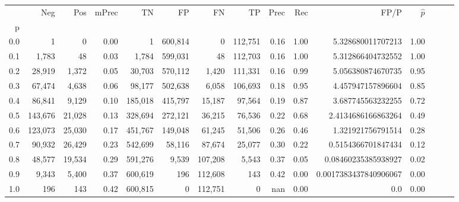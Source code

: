 \begin{tabular}{rrrrrrrrrrrrrrr}
\toprule
{} &      Neg &     Pos & mPrec &       TN &       FP &       FN &       TP &  Prec &   Rec &                   FP/P & $\hat{p}$ \\
p   &          &         &       &          &          &          &          &       &       &                        &           \\
\midrule
0.0 &        1 &       0 &  0.00 &        1 &  600,814 &        0 &  112,751 &  0.16 &  1.00 &      5.328680011707213 &      1.00 \\
0.1 &    1,783 &      48 &  0.03 &    1,784 &  599,031 &       48 &  112,703 &  0.16 &  1.00 &      5.312866404732552 &      1.00 \\
0.2 &   28,919 &   1,372 &  0.05 &   30,703 &  570,112 &    1,420 &  111,331 &  0.16 &  0.99 &      5.056380874670735 &      0.95 \\
0.3 &   67,474 &   4,638 &  0.06 &   98,177 &  502,638 &    6,058 &  106,693 &  0.18 &  0.95 &      4.457947157896604 &      0.85 \\
0.4 &   86,841 &   9,129 &  0.10 &  185,018 &  415,797 &   15,187 &   97,564 &  0.19 &  0.87 &      3.687745563232255 &      0.72 \\
0.5 &  143,676 &  21,028 &  0.13 &  328,694 &  272,121 &   36,215 &   76,536 &  0.22 &  0.68 &     2.4134686166863264 &      0.49 \\
0.6 &  123,073 &  25,030 &  0.17 &  451,767 &  149,048 &   61,245 &   51,506 &  0.26 &  0.46 &      1.321921756791514 &      0.28 \\
0.7 &   90,932 &  26,429 &  0.23 &  542,699 &   58,116 &   87,674 &   25,077 &  0.30 &  0.22 &     0.5154366701847434 &      0.12 \\
0.8 &   48,577 &  19,534 &  0.29 &  591,276 &    9,539 &  107,208 &    5,543 &  0.37 &  0.05 &    0.08460235385938927 &      0.02 \\
0.9 &    9,343 &   5,400 &  0.37 &  600,619 &      196 &  112,608 &      143 &  0.42 &  0.00 &  0.0017383437840906067 &      0.00 \\
1.0 &      196 &     143 &  0.42 &  600,815 &        0 &  112,751 &        0 &   nan &  0.00 &                    0.0 &      0.00 \\
\bottomrule
\end{tabular}
